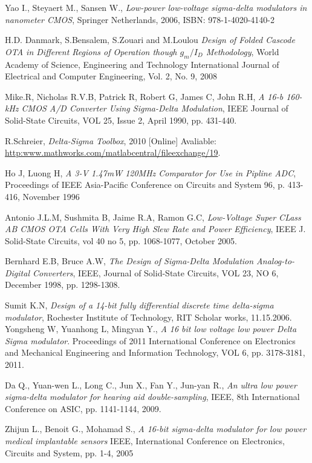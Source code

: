 \begin{thebibliography}{9}
Yao I., Steyaert M., Sansen W., 
\textit{Low-power low-voltage sigma-delta modulators in nanometer CMOS},
Springer Netherlands, 2006,
ISBN: 978-1-4020-4140-2

H.D. Danmark, S.Bensalem, S.Zouari and M.Loulou
\textit{Design of Folded Cascode OTA in Different Regions of Operation though $g_m/I_D$ Methodology},
World Academy of Science, Engineering and Technology International Journal of Electrical and Computer Engineering, Vol. 2, No. 9, 2008

Mike.R, Nicholas R.V.B, Patrick R, Robert G, James C, John R.H,
\textit{A 16-b 160-kHz CMOS A/D Converter Using Sigma-Delta Modulation},
IEEE Journal of Solid-State Circuits, VOL 25, Issue 2, April 1990, pp. 431-440.

R.Schreier,
\textit{Delta-Sigma Toolbox},
2010
[Online]
Avaliable:
\url{http:www.mathworks.com/matlabcentral/fileexchange/19}.

Ho J, Luong H,
\textit{A 3-V 1.47mW 120MHz Comparator for Use in Pipline ADC},
Proceedings of IEEE Asia-Pacific Conference on Circuits and System 96, p. 413-416, November 1996

Antonio J.L.M, Sushmita B, Jaime R.A, Ramon G.C,
\textit{Low-Voltage Super CLass AB CMOS OTA Cells With Very High Slew Rate and Power Efficiency},
IEEE J. Solid-State Circuits, vol 40 no 5, pp. 1068-1077, October 2005.

Bernhard E.B, Bruce A.W,
\textit{The Design of Sigma-Delta Modulation Analog-to-Digital Converters},
IEEE, Journal of Solid-State Circuits, VOL 23, NO 6, December 1998, pp. 1298-1308.

Sumit K.N, 
\textit{Design of a 14-bit fully differential discrete time delta-sigma modulator},
Rochester Institute of Technology, RIT Scholar works, 11.15.2006.
Yongsheng W, Yuanhong L, Mingyan Y.,
\textit{A 16 bit low voltage low power Delta Sigma modulator}.
Proceedings of 2011 International Conference on Electronics and Mechanical Engineering and Information Technology, VOL 6, pp. 3178-3181, 2011.

Da Q., Yuan-wen L., Long C., Jun X., Fan Y., Jun-yan R.,
\textit{An ultra low power sigma-delta modulator for hearing aid double-sampling},
IEEE, 8th International Conference on ASIC, pp. 1141-1144, 2009.

Zhijun L., Benoit G., Mohamad S., 
\textit{A 16-bit sigma-delta modulator for low power medical implantable sensors}
IEEE, International Conference on Electronics, Circuits and System, pp. 1-4, 2005


\end{thebibliography}
